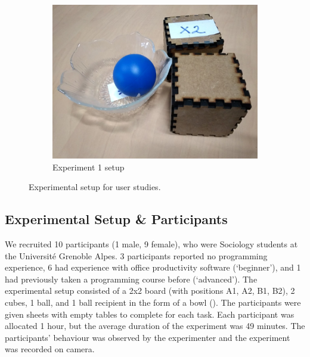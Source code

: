 \begin{figure}[htp]
\begin{subfigure}[t]{0.24\textwidth}
		\includegraphics[width=\textwidth]{figures/exp1-setup}%
		\caption{Experiment 1 setup}\label{fig:exp1-setup}%
	\end{subfigure} 	  
	\caption{Experimental setup for user studies.}
	\label{fig:pre-experiment}%
\end{figure}
\subsection{Experimental Setup \& Participants}
We recruited 10 participants (1 male, 9 female), who were Sociology students at the Universit\'{e} Grenoble Alpes.
3 participants reported no programming experience, 6  had experience with office productivity software (`beginner'), and 1 had previously taken a programming course before (`advanced').
%
The experimental setup consisted of a 2x2 board (with positions A1, A2, B1, B2), 2 cubes, 1 ball, and 1 ball recipient in the form of a bowl ().
The participants were given sheets with empty tables to complete for each task.
Each participant was allocated 1 hour, but the average duration of the experiment was 49 minutes.
The participants' behaviour was observed by the experimenter and the experiment was recorded on camera. 


 

